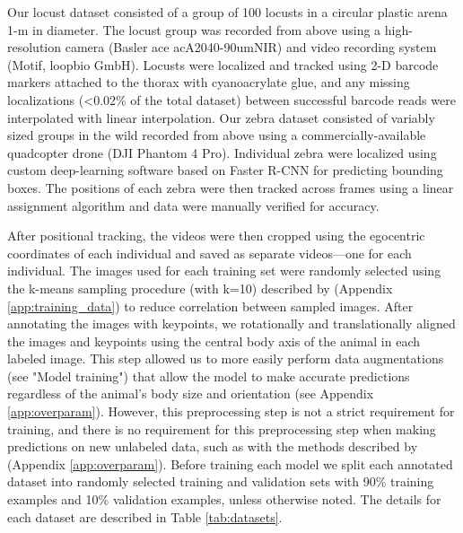 \documentclass[11pt,a4paper,oneside]{article}
\begin{document}
Our locust dataset consisted of a group of 100 locusts in a circular plastic arena 1-m in diameter. The locust group was recorded from above using a high-resolution camera (Basler ace acA2040-90umNIR) and video recording system (Motif, loopbio GmbH). Locusts were localized and tracked using 2-D barcode markers \citep{graving2017pinpoint} attached to the thorax with cyanoacrylate glue, and any missing localizations (<0.02$\%$ of the total dataset) between successful barcode reads were interpolated with linear interpolation.  Our zebra dataset consisted of variably sized groups in the wild recorded from above using a commercially-available quadcopter drone (DJI Phantom 4 Pro). Individual zebra were localized using custom deep-learning software based on Faster R-CNN \citep{ren2015faster} for predicting bounding boxes. The positions of each zebra were then tracked across frames using a linear assignment algorithm \citep{munkres1957algorithms} and data were manually verified for accuracy.

After positional tracking, the videos were then cropped using the egocentric coordinates of each individual and saved as separate videos---one for each individual. The images used for each training set were randomly selected using the k-means sampling procedure (with k=10) described by \cite{pereira2019fast} (Appendix \ref{app:training_data}) to reduce correlation between sampled images. After annotating the images with keypoints, we rotationally and translationally aligned the images and keypoints using the central body axis of the animal in each labeled image. This step allowed us to more easily perform data augmentations (see "Model training") that allow the model to make accurate predictions regardless of the animal's body size and orientation (see Appendix \ref{app:overparam}). However, this preprocessing step is not a strict requirement for training, and there is no requirement for this preprocessing step when making predictions on new unlabeled data, such as with the methods described by \cite{pereira2019fast} (Appendix \ref{app:overparam}). Before training each model we split each annotated dataset into randomly selected training and validation sets with 90\% training examples and 10\% validation examples, unless otherwise noted. The details for each dataset are described in Table \ref{tab:datasets}.
\end{document}
